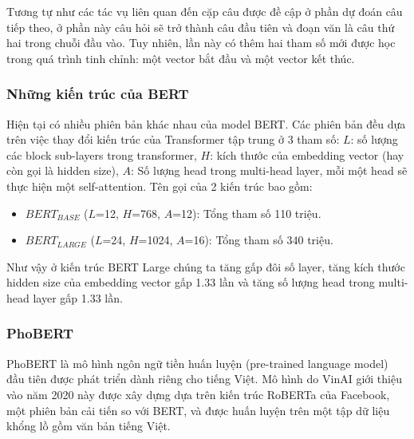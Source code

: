 Tương tự như các tác vụ liên quan đến cặp câu được đề cập ở phần dự đoán câu tiếp theo, ở phần này câu hỏi sẽ trở thành câu đầu tiên và đoạn văn là câu thứ hai trong chuỗi đầu vào. Tuy nhiên, lần này có thêm hai tham số mới được học trong quá trình tinh chỉnh: một vector bắt đầu và một vector kết thúc.

\subsubsection{Những kiến trúc của BERT}
Hiện tại có nhiều phiên bản khác nhau của model BERT. Các phiên bản đều dựa trên việc thay đổi kiến trúc của Transformer tập trung ở 3 tham số: $L$: số lượng các block sub-layers trong transformer, $H$: kích thước của embedding vector (hay còn gọi là hidden size), $A$: Số lượng head trong multi-head layer, mỗi một head sẽ thực hiện một self-attention. Tên gọi của 2 kiến trúc bao gồm:
\begin{itemize}
    \item $BERT_{BASE}$ ($L$=12, $H$=768, $A$=12): Tổng tham số 110 triệu.
    \item $BERT_{LARGE}$ ($L$=24, $H$=1024, $A$=16): Tổng tham số 340 triệu.
\end{itemize}
Như vậy ở kiến trúc BERT Large chúng ta tăng gấp đôi số layer, tăng kích thước hidden size của embedding vector gấp 1.33 lần và tăng số lượng head trong multi-head layer gấp 1.33 lần.

\subsubsection{PhoBERT}

PhoBERT là mô hình ngôn ngữ tiền huấn luyện (pre-trained language model) đầu tiên được phát triển dành riêng cho tiếng Việt. Mô hình do VinAI giới thiệu vào năm 2020 này được xây dựng dựa trên kiến trúc RoBERTa của Facebook, một phiên bản cải tiến so với BERT, và được huấn luyện trên một tập dữ liệu khổng lồ gồm văn bản tiếng Việt\cite{webpage21}.

